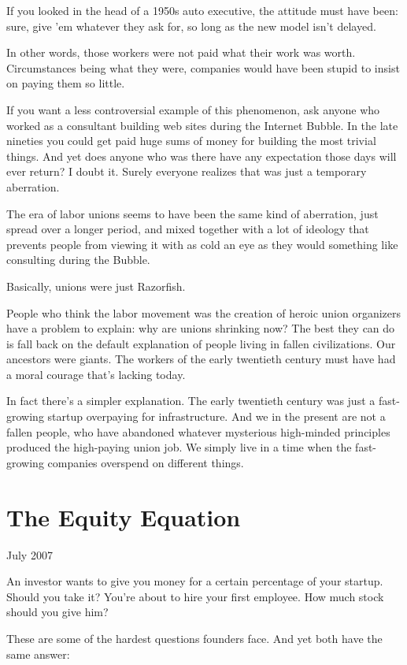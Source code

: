 \documentclass[12pt]{book}
\begin{document}
If you looked in the head of a 1950s auto executive, the attitude must
have been: sure, give 'em whatever they ask for, so long as the new
model isn't delayed.

In other words, those workers were not paid what their work was worth.
Circumstances being what they were, companies would have been stupid to
insist on paying them so little.

If you want a less controversial example of this phenomenon, ask anyone
who worked as a consultant building web sites during the Internet
Bubble. In the late nineties you could get paid huge sums of money for
building the most trivial things. And yet does anyone who was there have
any expectation those days will ever return? I doubt it. Surely everyone
realizes that was just a temporary aberration.

The era of labor unions seems to have been the same kind of aberration,
just spread over a longer period, and mixed together with a lot of
ideology that prevents people from viewing it with as cold an eye as
they would something like consulting during the Bubble.

Basically, unions were just Razorfish.

People who think the labor movement was the creation of heroic union
organizers have a problem to explain: why are unions shrinking now? The
best they can do is fall back on the default explanation of people
living in fallen civilizations. Our ancestors were giants. The workers
of the early twentieth century must have had a moral courage that's
lacking today.

In fact there's a simpler explanation. The early twentieth century was
just a fast-growing startup overpaying for infrastructure. And we in the
present are not a fallen people, who have abandoned whatever mysterious
high-minded principles produced the high-paying union job. We simply
live in a time when the fast-growing companies overspend on different
things.
\chapter{The Equity Equation}

July 2007

An investor wants to give you money for a certain percentage of your
startup. Should you take it? You're about to hire your first employee.
How much stock should you give him?

These are some of the hardest questions founders face. And yet both have
the same answer:
\end{document}

